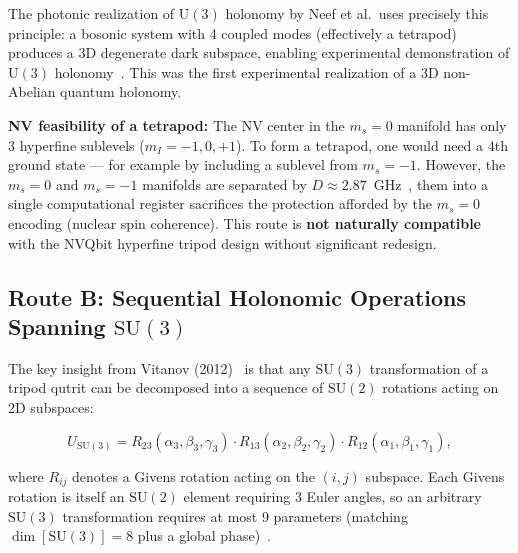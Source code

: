 \documentclass[11pt,letterpaper]{article}
\newcommand{\SU}{\mathrm{SU}}
\newcommand{\UU}{\mathrm{U}}
\begin{document}
The photonic realization of $\UU(3)$ holonomy by Neef et al.\ uses precisely this
principle: a bosonic system with 4 coupled modes (effectively a tetrapod) produces a 3D
degenerate dark subspace, enabling experimental demonstration of $\UU(3)$
holonomy~\cite{Neef2023}. %
This was the first experimental realization of a 3D non-Abelian
quantum holonomy.

\textbf{NV feasibility of a tetrapod:} The NV center in the $m_s = 0$ manifold has only 3
hyperfine sublevels ($m_I = -1, 0, +1$). To form a tetrapod, one would need a 4th ground
state --- for example by including a sublevel from $m_s = -1$. However, the $m_s = 0$ and
$m_s = -1$ manifolds are separated by $D \approx 2.87$~GHz~\cite{Doherty2013}, %
them into a single computational register sacrifices the protection afforded by the
$m_s = 0$ encoding (nuclear spin coherence). This route is \textbf{not naturally
compatible} with the NVQbit hyperfine tripod design without significant redesign.

\subsection{Route B: Sequential Holonomic Operations Spanning $\SU(3)$}
\label{sec:sequential}

The key insight from Vitanov (2012)~\cite{Vitanov2012} is that any $\SU(3)$ transformation %
of a tripod qutrit can be decomposed into a sequence of $\SU(2)$ rotations acting on
2D subspaces:

\begin{equation}
  U_{\SU(3)} = R_{23}(\alpha_3, \beta_3, \gamma_3) \cdot R_{13}(\alpha_2, \beta_2, \gamma_2) \cdot R_{12}(\alpha_1, \beta_1, \gamma_1),
  \label{eq:givens}
\end{equation}

where $R_{ij}$ denotes a Givens rotation acting on the $(i,j)$ subspace. Each Givens
rotation is itself an $\SU(2)$ element requiring 3 Euler angles, so an arbitrary $\SU(3)$
transformation requires at most 9 parameters %
(matching $\dim[\SU(3)] = 8$ %
plus a global phase)~\cite{Vitanov2012}.
\end{document}
